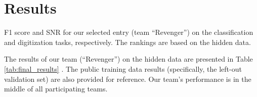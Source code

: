 \section{Results}
\label{sec:results}

\begin{table}[!htp]
\centering

\caption{F1 score and SNR for our selected entry (team ``Revenger'') on the classification and digitization tasks, respectively. The rankings are based on the hidden data.}
\label{tab:final_results}
\end{table}

The results of our team (``Revenger'') on the hidden data \cite{reyna2024_cinc2024_database} are presented in Table \ref{tab:final_results}
. The public training data results (specifically, the left-out validation set) are also provided for reference. Our team's performance is in the middle of all participating teams.
